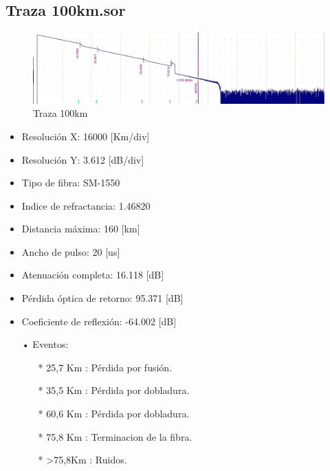 \documentclass{article}
\begin{document}
\subsection{Traza 100km.sor}

\begin{figure}[h]
 \begin{center}
	\includegraphics[width=\textwidth]{imagenes/sim3.jpg} 
	\caption{Traza 100km}\label{fig:fig1}
 \end{center}
\end{figure}

\begin{itemize}\itemsep0em \itemindent=2em
\item Resolución X: 16000 [Km/div]
\item Resolución Y:	3.612 [dB/div]
\item Tipo de fibra: SM-1550
\item Indice de refractancia: 1.46820
\item Distancia máxima: 160 [km]
\item Ancho de pulso: 20 [us]
\item Atenuación completa: 16.118 [dB]
\item Pérdida óptica de retorno: 95.371 [dB]
\item Coeficiente de reflexión: -64.002 [dB]
\end{itemize}

\begin{itemize}\itemsep0em \itemindent=2em
\item[•]Eventos:
	\begin{itemize}\itemsep0em \itemindent=2em
	\item[*] 25,7 Km : Pérdida por fusión.
	\item[*] 35,5 Km : Pérdida por dobladura.
	\item[*] 60,6 Km : Pérdida por dobladura.
	\item[*] 75,8 Km : Terminacion de la fibra.
	\item[*] >75,8Km : Ruidos.
\end{itemize}
\end{itemize}
\end{document}
